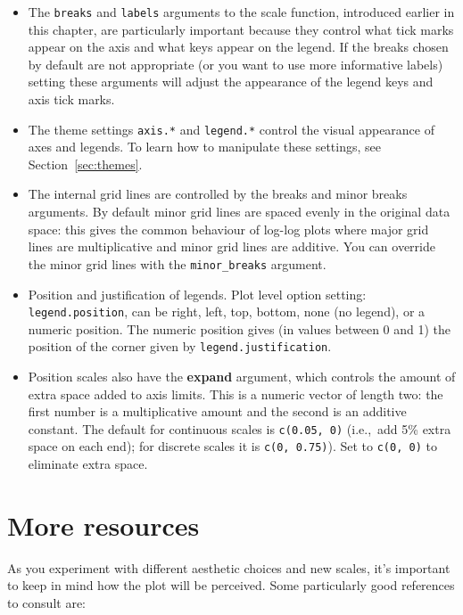 \begin{itemize}
  \item The {\tt breaks} and {\tt labels} arguments to the scale function, introduced earlier in this chapter, are particularly important because they control what tick marks appear on the axis and what keys appear on the legend.  If the breaks chosen by default are not appropriate (or you want to use more informative labels) setting these arguments will adjust the appearance of the legend keys and axis tick marks.  
  
  \item The theme settings {\tt axis.*} and {\tt legend.*} control the visual appearance of axes and legends.  To learn how to manipulate these settings, see Section~\ref{sec:themes}.

  \item The internal grid lines are controlled by the breaks and minor breaks arguments.  By default minor grid lines are spaced evenly in the original data space: this gives the common behaviour of log-log plots where major grid lines are multiplicative and minor grid lines are additive.  You can override the minor grid lines with the {\tt minor\_breaks} argument.

  \item Position and justification of legends.  Plot level option setting: {\tt legend.position}, can be right, left, top, bottom, none (no legend), or a numeric position.  The numeric position gives (in values between 0 and 1) the position of the corner given by {\tt legend.justification}.  
  
  \item Position scales also have the {\bf expand} argument, which controls the amount of extra space added to axis limits.  This is a numeric vector of length two: the first number is a multiplicative amount and the second is an additive constant.  The default for continuous scales is {\tt c(0.05, 0)} (i.e.,\ add 5\% extra space on each end); for discrete scales it is {\tt c(0, 0.75)}).  Set to {\tt c(0, 0)} to eliminate extra space.
  
\end{itemize}

\section{More resources}
\label{sec:scale_resources}

As you experiment with different aesthetic choices and new scales, it's important to keep in mind how the plot will be perceived.   Some particularly good references to consult are:

